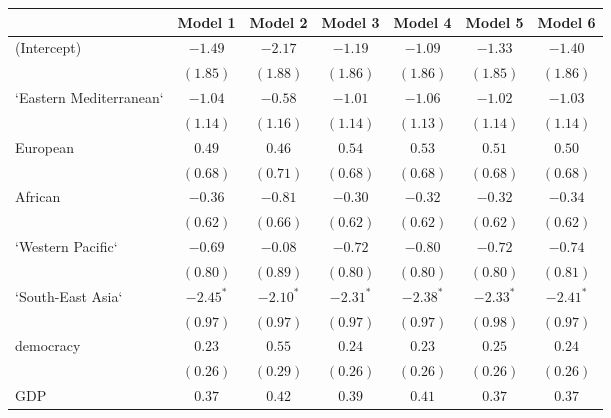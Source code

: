 
\begin{table}[!h]
\begin{center}
\begin{tabular}{l c c c c c c }
\toprule
 & Model 1 & Model 2 & Model 3 & Model 4 & Model 5 & Model 6 \\
\midrule
(Intercept)             & $-1.49$      & $-2.17$      & $-1.19$      & $-1.09$      & $-1.33$      & $-1.40$      \\
                        & $(1.85)$     & $(1.88)$     & $(1.86)$     & $(1.86)$     & $(1.85)$     & $(1.86)$     \\
`Eastern Mediterranean` & $-1.04$      & $-0.58$      & $-1.01$      & $-1.06$      & $-1.02$      & $-1.03$      \\
                        & $(1.14)$     & $(1.16)$     & $(1.14)$     & $(1.13)$     & $(1.14)$     & $(1.14)$     \\
European                & $0.49$       & $0.46$       & $0.54$       & $0.53$       & $0.51$       & $0.50$       \\
                        & $(0.68)$     & $(0.71)$     & $(0.68)$     & $(0.68)$     & $(0.68)$     & $(0.68)$     \\
African                 & $-0.36$      & $-0.81$      & $-0.30$      & $-0.32$      & $-0.32$      & $-0.34$      \\
                        & $(0.62)$     & $(0.66)$     & $(0.62)$     & $(0.62)$     & $(0.62)$     & $(0.62)$     \\
`Western Pacific`       & $-0.69$      & $-0.08$      & $-0.72$      & $-0.80$      & $-0.72$      & $-0.74$      \\
                        & $(0.80)$     & $(0.89)$     & $(0.80)$     & $(0.80)$     & $(0.80)$     & $(0.81)$     \\
`South-East Asia`       & $-2.45^{*}$  & $-2.10^{*}$  & $-2.31^{*}$  & $-2.38^{*}$  & $-2.33^{*}$  & $-2.41^{*}$  \\
                        & $(0.97)$     & $(0.97)$     & $(0.97)$     & $(0.97)$     & $(0.98)$     & $(0.97)$     \\
democracy               & $0.23$       & $0.55$       & $0.24$       & $0.23$       & $0.25$       & $0.24$       \\
                        & $(0.26)$     & $(0.29)$     & $(0.26)$     & $(0.26)$     & $(0.26)$     & $(0.26)$     \\
GDP                     & $0.37$       & $0.42$       & $0.39$       & $0.41$       & $0.37$       & $0.37$       \\

\end{tabular}
\end{center}
\end{table}
